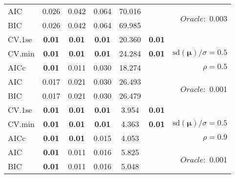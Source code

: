 \begin{table}
\begin{center}
\begin{tabular}{l*{5}{c}|r}
AIC & 0.026 & 0.042 & 0.064 & 70.016 & &  \multirow{2}{*}{$Oracle: $ 0.003} \\
BIC & 0.026 & 0.042 & 0.064 & 69.985 & &  \\
 \hline 
CV.1se & {\bf 0.01} & {\bf 0.01} & {\bf 0.01} & 20.360 & {\bf 0.01} & \\
CV.min & {\bf 0.01} & {\bf 0.01} & {\bf 0.01} & 24.284 & {\bf 0.01} &  $\mathrm{sd}(\mathbf{\mu})/\sigma=0.5$ \\
AICc & {\bf 0.01} & 0.011 & 0.030 & 18.274 & & $\rho=0.5$ \\
AIC & 0.017 & 0.021 & 0.030 & 26.493 & &  \multirow{2}{*}{$Oracle: $ 0.001} \\
BIC & 0.017 & 0.021 & 0.030 & 26.479 & &  \\
 \hline 
CV.1se & {\bf 0.01} & {\bf 0.01} & {\bf 0.01} & 3.954 & {\bf 0.01} & \\
CV.min & {\bf 0.01} & {\bf 0.01} & {\bf 0.01} & 4.363 & {\bf 0.01} &  $\mathrm{sd}(\mathbf{\mu})/\sigma=0.5$ \\
AICc & {\bf 0.01} & {\bf 0.01} & 0.015 & 4.053 & & $\rho=0.9$ \\
AIC & {\bf 0.01} & 0.011 & 0.016 & 5.825 & &  \multirow{2}{*}{$Oracle: $ 0.001} \\
BIC & {\bf 0.01} & 0.011 & 0.016 & 5.048 & &  \\
 \hline 
\end{tabular}
\end{center}
\vspace{-1cm}
\end{table}




